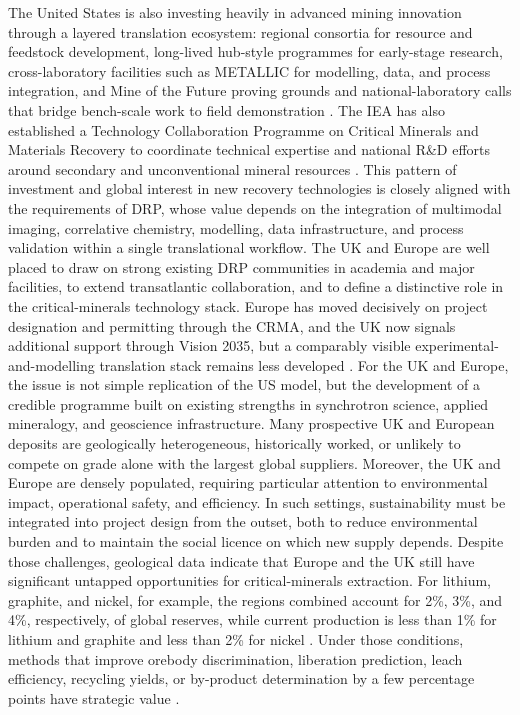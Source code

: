 \documentclass[12pt,a4paper]{article}
\begin{document}
The United States is also investing heavily in advanced mining innovation through a layered translation ecosystem: regional consortia for resource and feedstock development, long-lived hub-style programmes for early-stage research, cross-laboratory facilities such as METALLIC for modelling, data, and process integration, and Mine of the Future proving grounds and national-laboratory calls that bridge bench-scale work to field demonstration \cite{doe_regional_consortia_2025, doe_cmi_2025, doe_metallic_2024, doe_motf_launch_2025}. The IEA has also established a Technology Collaboration Programme on Critical Minerals and Materials Recovery to coordinate technical expertise and national R\&D efforts around secondary and unconventional mineral resources \cite{iea_cmmr_tcp_2026}. This pattern of investment and global interest in new recovery technologies is closely aligned with the requirements of DRP, whose value depends on the integration of multimodal imaging, correlative chemistry, modelling, data infrastructure, and process validation within a single translational workflow. The UK and Europe are well placed to draw on strong existing DRP communities in academia and major facilities, to extend transatlantic collaboration, and to define a distinctive role in the critical-minerals technology stack. Europe has moved decisively on project designation and permitting through the CRMA, and the UK now signals additional support through Vision 2035, but a comparably visible experimental-and-modelling translation stack remains less developed \cite{eu_strategic_projects_2025, uk_vision_2035_2026}. For the UK and Europe, the issue is not simple replication of the US model, but the development of a credible programme built on existing strengths in synchrotron science, applied mineralogy, and geoscience infrastructure. Many prospective UK and European deposits are geologically heterogeneous, historically worked, or unlikely to compete on grade alone with the largest global suppliers. Moreover, the UK and Europe are densely populated, requiring particular attention to environmental impact, operational safety, and efficiency. In such settings, sustainability must be integrated into project design from the outset, both to reduce environmental burden and to maintain the social licence on which new supply depends. Despite those challenges, geological data indicate that Europe and the UK still have significant untapped opportunities for critical-minerals extraction. For lithium, graphite, and nickel, for example, the regions combined account for 2\%, 3\%, and 4\%, respectively, of global reserves, while current production is less than 1\% for lithium and graphite and less than 2\% for nickel \cite{iea_outlook_2025}. Under those conditions, methods that improve orebody discrimination, liberation prediction, leach efficiency, recycling yields, or by-product determination by a few percentage points have strategic value \cite{albert_crm_europe_2025, bgs_uk_crm_2022, calvo_copper_2016}.
\end{document}
